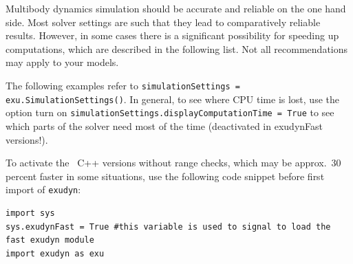\label{secSpeedUp}
%
Multibody dynamics simulation should be accurate and reliable on the one hand side. Most solver settings are such that they lead to comparatively reliable results.
However, in some cases there is a significant possibility for speeding up computations, which are described in the following list. Not all recommendations may apply to your models.

The following examples refer to \texttt{simulationSettings = exu.SimulationSettings()}.
In general, to see where CPU time is lost, use the option turn on \texttt{simulationSettings.displayComputationTime = True} to see which parts of the solver need most of the time (deactivated in exudynFast versions!).

To activate the \codeName\ C++ versions without range checks, which may be approx.\ 30 percent faster in some situations, use the following code snippet before first import of \texttt{exudyn}:
\pythonstyle\begin{lstlisting}
import sys
sys.exudynFast = True #this variable is used to signal to load the fast exudyn module
import exudyn as exu
\end{lstlisting}

